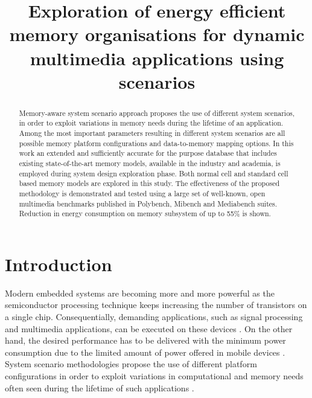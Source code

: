 \documentclass[a4paper,conference]{IEEEtran}
\begin{document}
\title{Exploration of energy efficient memory organisations for dynamic multimedia applications using scenarios}
\author{
}

\maketitle

\begin{abstract}
Memory-aware system scenario approach proposes the use of different system scenarios, in order to exploit variations in memory needs during the lifetime of an application. Among the most important parameters resulting in different system scenarios are all possible memory platform configurations and data-to-memory mapping options. In this work an extended and sufficiently accurate for the purpose database that includes existing state-of-the-art memory models, available in the industry and academia, is employed during system design exploration phase. Both normal cell and standard cell based memory models are explored in this study. The effectiveness of the proposed methodology is demonstrated and tested using a large set of well-known, open multimedia benchmarks published in Polybench, Mibench and Mediabench suites. Reduction in energy consumption on memory subsystem of up to 55\% is shown.
\end{abstract}
\IEEEpeerreviewmaketitle

\section{Introduction}
\label{sec:introduction}

Modern embedded systems are becoming more and more powerful as the semiconductor processing technique keeps increasing the number of transistors on a single chip. Consequentially, demanding applications, such as signal processing and multimedia applications, can be executed on these devices \cite{narasinga}. On the other hand, the desired performance has to be delivered with the minimum power consumption due to the limited amount of power offered in mobile devices \cite{tcm}. System scenario methodologies propose the use of different platform configurations in order to exploit variations in computational and memory needs often seen during the lifetime of such applications \cite{tcm}. 
\end{document}
